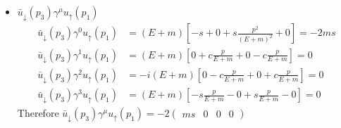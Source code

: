 \begin{enumerate}[label=\alph*)]
\begin{itemize}
		\item \(\bar{u}_{\downarrow}(p_{3})\gamma^{\mu}u_{\uparrow}(p_{1})\)
		\begin{align}
		\bar{u}_{\downarrow}(p_{3})\gamma^{0}u_{\uparrow}(p_{1})&=(E+m)\left[-s+0+s\tfrac{p^{2}}{(E+m)^{2}}+0\right]=-2ms \\
		\bar{u}_{\downarrow}(p_{3})\gamma^{1}u_{\uparrow}(p_{1})&=(E+m)\left[0+c\tfrac{p}{E+m}+0-c\tfrac{p}{E+m}\right]=0 \\
		\bar{u}_{\downarrow}(p_{3})\gamma^{2}u_{\uparrow}(p_{1})&=-i(E+m)\left[0-c\tfrac{p}{E+m}+0+c\tfrac{p}{E+m}\right]=0 \\
		\bar{u}_{\downarrow}(p_{3})\gamma^{3}u_{\uparrow}(p_{1})&=(E+m)\left[-s\tfrac{p}{E+m}-0+s\tfrac{p}{E+m}-0\right] =0
		\end{align}
		Therefore \(\bar{u}_{\downarrow}(p_{3})\gamma^{\mu}u_{\uparrow}(p_{1})=-2 \left(\begin{array}{cccc}ms & 0 & 0 & 0\end{array}\right)\)
	\end{itemize}
\end{enumerate}



